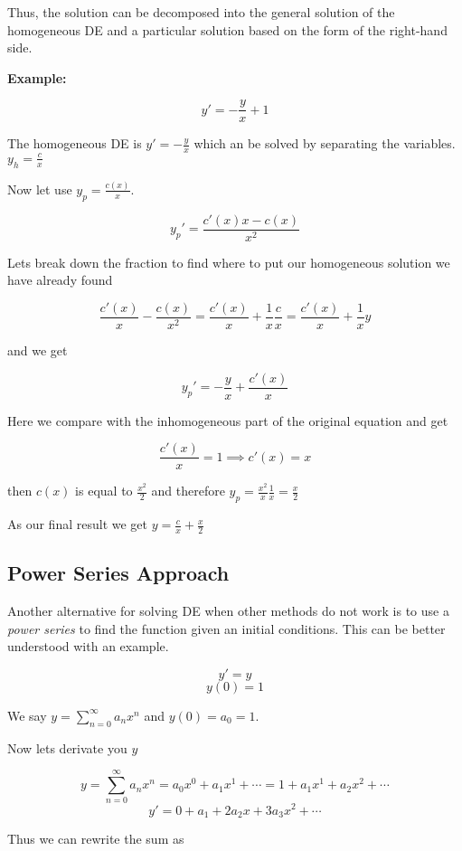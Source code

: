 Thus, the solution can be decomposed into the general solution of the homogeneous DE and a particular solution based on the form of the right-hand side.
\vspace{\baselineskip}

\textbf{Example: }

\[y' = -\frac{y}{x} + 1\]

The homogeneous DE is \(y' = -\frac{y}{x}\) which an be solved by separating the variables.
\(y_h = \frac{c}{x}\)

Now let use \(y_p = \frac{c(x)}{x}\).

\[
y_{p}' = \frac{c'(x)x - c(x)}{x^2}
\]

Lets break down the fraction to find where to put our homogeneous solution we have already found

\[
\frac{c'(x)}{x} - \frac{c(x)}{x^2} = \frac{c'(x)}{x} + \frac{1}{x}\frac{c}{x} = \frac{c'(x)}{x} + \frac{1}{x}y
\]

and we get

\[
y_{p}' = -\frac{y}{x} + \frac{c'(x)}{x} 
\]

Here we compare with the inhomogeneous part of the original equation and get

\[
\frac{c'(x)}{x} = 1 \implies c'(x) = x
\]

then \(c(x)\) is equal to \(\frac{x^2}{2}\) and therefore \(y_p = \frac{x^2}{x}\frac{1}{x} = \frac{x}{2}\)
\vspace{\baselineskip}

As our final result we get \(y = \frac{c}{x} + \frac{x}{2}\)

\subsection{Power Series Approach}

Another alternative for solving DE when other methods do not work is to use a \emph{power series} 
to find the function given an initial conditions. This can be better understood with an example.

\[y' = y\]
\[y(0) = 1\]

We say \(y = \sum_{n = 0}^{\infty} a_n x^n\) and \(y(0) = a_0 = 1\).

Now lets derivate you \(y\)

\[
y = \sum_{n = 0}^{\infty} a_n x^n = a_0 x^0 + a_1 x^1 + \cdots = 1 + a_1 x^1 + a_2 x^2 + \cdots
\]
\[
y' = 0  + a_1 + 2 a_2 x + 3 a_3 x^2 + \cdots 
\]

Thus we can rewrite the sum as 

